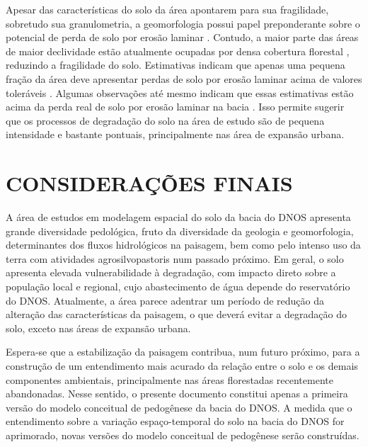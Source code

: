 Apesar das características do solo da área apontarem para sua fragilidade, sobretudo sua granulometria, a 
geomorfologia possui papel preponderante sobre o potencial de perda de solo por erosão laminar 
\cite{Miguel2010}. Contudo, a maior parte das áreas de maior declividade estão atualmente ocupadas por densa 
cobertura florestal \cite{SamuelRosaEtAl2011a}, reduzindo a fragilidade do solo. Estimativas indicam que apenas 
uma pequena fração da área deve apresentar perdas de solo por erosão laminar acima de valores toleráveis 
\cite{Miguel2010}. Algumas observações até mesmo indicam que essas estimativas estão acima da perda real de 
solo por erosão laminar na bacia \cite{Branco1998, MouraBueno2012}. Isso permite sugerir que os processos de 
degradação do solo na área de estudo são de pequena intensidade e bastante pontuais, principalmente nas área 
de expansão urbana.

\section{CONSIDERAÇÕES FINAIS}

A área de estudos em modelagem espacial do solo da bacia do DNOS apresenta grande diversidade pedológica, 
fruto da diversidade da geologia e geomorfologia, determinantes dos fluxos hidrológicos na paisagem, bem como 
pelo intenso uso da terra com atividades agrosilvopastoris num passado próximo. Em geral, o solo apresenta 
elevada vulnerabilidade à degradação, com impacto direto sobre a população local e regional, cujo 
abastecimento de água depende do reservatório do DNOS. Atualmente, a área parece adentrar um período de redução 
da alteração das características da paisagem, o que deverá evitar a degradação do solo, exceto nas áreas de 
expansão urbana.

Espera-se que a estabilização da paisagem contribua, num futuro próximo, para a construção de um entendimento 
mais acurado da relação entre o solo e os demais componentes ambientais, principalmente nas áreas florestadas 
recentemente abandonadas. Nesse sentido, o presente documento constitui apenas a primeira versão do modelo 
conceitual de pedogênese da bacia do DNOS. A medida que o entendimento sobre a variação espaço-temporal do 
solo na bacia do DNOS for aprimorado, novas versões do modelo conceitual de pedogênese serão construídas.
